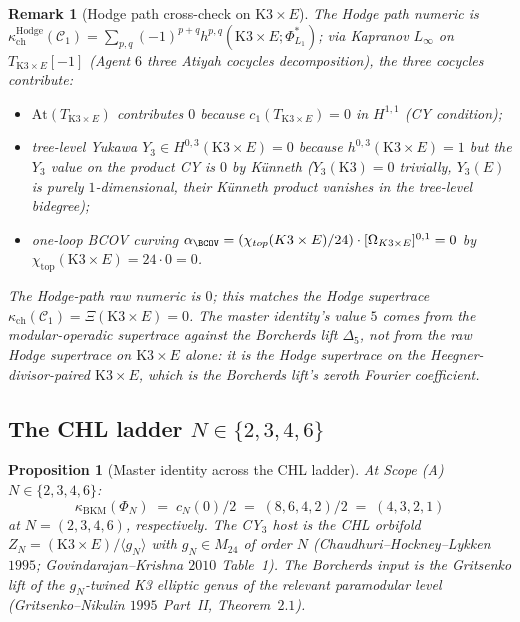 \documentclass[11pt]{amsart}
\newtheorem{proposition}[theorem]{Proposition}
\newtheorem{remark}[theorem]{Remark}
\providecommand{\cC}{\mathcal{C}}
\providecommand{\At}{\mathrm{At}}
\providecommand{\kBKM}{\kappa_{\mathrm{BKM}}}
\providecommand{\kch}{\kappa_{\mathrm{ch}}}
\begin{document}
\begin{remark}[Hodge path cross-check on $\mathrm{K3} \times E$]
The Hodge path numeric is $\kch^{\mathrm{Hodge}}(\cC_1) =
\sum_{p, q} (-1)^{p + q} h^{p, q}(\mathrm{K3} \times E;
\Phi^*_{L_1})$; via Kapranov $L_\infty$ on
$T_{\mathrm{K3} \times E}[-1]$ (Agent $6$ three Atiyah cocycles
decomposition), the three cocycles contribute:
\begin{itemize}
\item $\At(T_{\mathrm{K3} \times E})$ contributes $0$ because
$c_1(T_{\mathrm{K3} \times E}) = 0$ in $H^{1, 1}$ (CY condition);
\item tree-level Yukawa $Y_3 \in H^{0, 3}(\mathrm{K3} \times E) = 0$
because $h^{0, 3}(\mathrm{K3} \times E) = 1$ but the $Y_3$ value on
the product CY is $0$ by K\"unneth ($Y_3(\mathrm{K3}) = 0$ trivially,
$Y_3(E)$ is purely $1$-dimensional, their K\"unneth product
vanishes in the tree-level bidegree);
\item one-loop BCOV curving $\alpha_{\BCOV} = (\chi_{\mathrm{top}}(
\mathrm{K3} \times E)/24) \cdot [\Omega_{\mathrm{K3} \times E}]^{0,
1} = 0$ by $\chi_{\mathrm{top}}(\mathrm{K3} \times E) = 24 \cdot 0 =
0$.
\end{itemize}
The Hodge-path raw numeric is $0$; this matches the Hodge supertrace
$\kch(\cC_1) = \Xi(\mathrm{K3} \times E) = 0$. The master identity's
value $5$ comes from the modular-operadic supertrace against the
Borcherds lift $\Delta_5$, not from the raw Hodge supertrace on
$\mathrm{K3} \times E$ alone: it is the Hodge supertrace on the
\emph{Heegner-divisor-paired} $\mathrm{K3} \times E$, which is
the Borcherds lift's zeroth Fourier coefficient.
\end{remark}

\subsection{The CHL ladder $N \in \{2, 3, 4, 6\}$}

\begin{proposition}[Master identity across the CHL ladder]
\label{prop:master-chl-ladder}
At Scope (A) $N \in \{2, 3, 4, 6\}$:
\[
 \kBKM(\Phi_N) \;=\; c_N(0)/2
 \;=\; (8, 6, 4, 2) / 2
 \;=\; (4, 3, 2, 1)
\]
at $N = (2, 3, 4, 6)$, respectively. The CY$_3$ host is the CHL
orbifold $Z_N = (\mathrm{K3} \times E)/\langle g_N \rangle$ with
$g_N \in M_{24}$ of order $N$ (Chaudhuri--Hockney--Lykken $1995$;
Govindarajan--Krishna $2010$ Table~1). The Borcherds input is the
Gritsenko lift of the $g_N$-twined K3 elliptic genus of the
relevant paramodular level (Gritsenko--Nikulin $1995$ Part~II,
Theorem~$2.1$).
\end{proposition}
\end{document}

